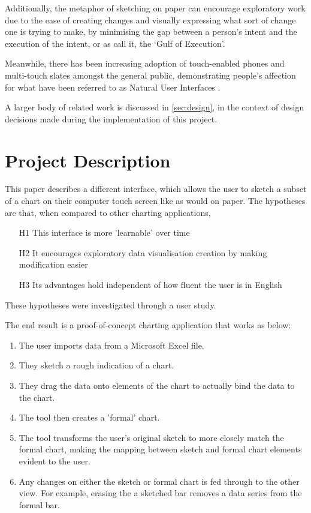 
Additionally, the metaphor of sketching on paper can encourage exploratory work due to the ease of creating changes and visually expressing what sort of change one is trying to make, by minimising the gap between a person's intent and the execution of the intent, or as \cite{norman_user_1986} call it, the `Gulf of Execution'.

Meanwhile, there has been increasing adoption of touch-enabled phones and multi-touch slates amongst the general public, demonstrating people's affection for what have been referred to as Natural User Interfaces \citep{lee_beyond_2012}.

A larger body of related work is discussed in \autoref{sec:design}, in the context of design decisions made during the implementation of this project.

\section{Project Description}
This paper describes a different interface, which allows the user to sketch a subset of a chart on their computer touch screen like as would on paper. The hypotheses are that, when compared to other charting applications,

\begin{enumerate}
\item[H1] This interface is more 'learnable' over time
\item[H2] It encourages exploratory data visualisation creation by making modification easier
\item[H3] Its advantages hold independent of how fluent the user is in English
\end{enumerate}

These hypotheses were investigated through a user study.

The end result is a proof-of-concept charting application that works as below:
\begin{enumerate}
\item The user imports data from a Microsoft Excel file.
\item They sketch a rough indication of a chart.
\item They drag the data onto elements of the chart to actually bind the data to the chart. 
\item The tool then creates a 'formal' chart.
\item The tool transforms the user's original sketch to more closely match the formal chart, making the mapping between sketch and formal chart elements evident to the user.
\item Any changes on either the sketch or formal chart is fed through to the other view. For example, erasing the a sketched bar removes a data series from the formal bar.
\end{enumerate}


